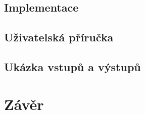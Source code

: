 \section{Implementace}

\section{Uživatelská příručka}

\section{Ukázka vstupů a výstupů}


\chapter{Závěr}




